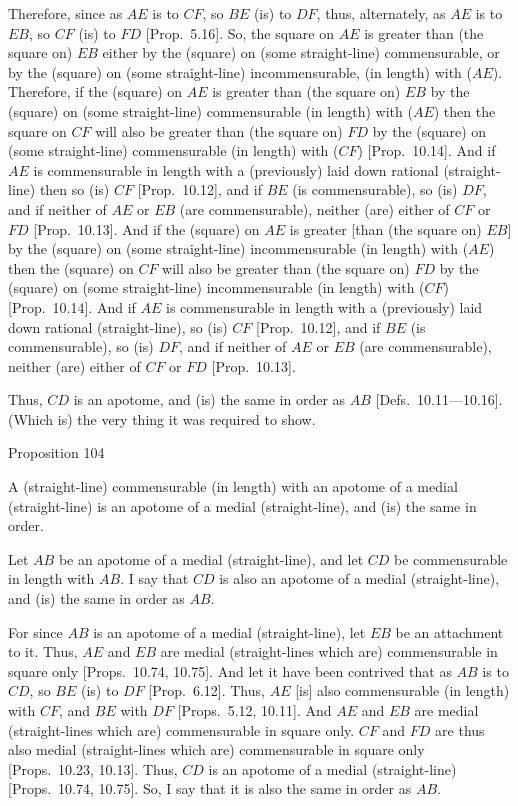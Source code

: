 Therefore, since as $AE$ is to $CF$, so $BE$ (is) to $DF$, thus, alternately,
as $AE$ is to $EB$, so $CF$ (is) to $FD$ [Prop.~5.16]. So,  the square on $AE$
is greater than (the square on) $EB$ either by the (square) on (some straight-line)
commensurable,  or by the (square) on (some straight-line)
incommensurable, (in length) with ($AE$). Therefore, if the
(square) on $AE$ is greater than (the square on) $EB$ by the (square)
on (some straight-line) commensurable (in length) with ($AE$) then the
square on $CF$ will also be greater than (the square on) $FD$ by the (square)
on (some straight-line) commensurable (in length) with ($CF$)
[Prop.~10.14]. And if $AE$ is commensurable
in length with a (previously) laid down rational (straight-line) then so (is)
$CF$ [Prop.~10.12], and if $BE$ (is commensurable), so (is) $DF$, and if neither of
$AE$ or $EB$ (are commensurable), neither  (are) either of $CF$ or $FD$
[Prop.~10.13]. And if the (square) on
$AE$ is greater [than (the square on) $EB$] by the (square) on
(some straight-line) incommensurable (in length) with ($AE$) then the
(square) on $CF$ will also be greater than (the square on) $FD$ by the (square)
on (some straight-line) incommensurable (in length) with ($CF$)
[Prop.~10.14].  And if $AE$ is commensurable
in length with a (previously) laid down rational (straight-line), so (is)
$CF$ [Prop.~10.12], and if $BE$ (is commensurable), so (is) $DF$, and if neither of
$AE$ or $EB$ (are commensurable),  neither (are)  either of $CF$ or $FD$
[Prop.~10.13].

Thus, $CD$ is an apotome, and (is) the same in order as $AB$ [Defs.~10.11---10.16].
(Which is) the very thing it was required to show.


\begin{center}
{\large Proposition 104}
\end{center}

A (straight-line) commensurable (in length)
with an apotome of a medial (straight-line) is an apotome of a
medial (straight-line), and (is) the same in order.

\epsfysize=0.7in
\centerline{}

Let $AB$ be an apotome of a medial (straight-line), and let $CD$
be commensurable in length with $AB$. I say that $CD$ is also an
apotome of a medial (straight-line), and (is) the same in order as $AB$.

For since $AB$ is an apotome of a medial (straight-line), let $EB$ be
an attachment to it. Thus, $AE$ and $EB$ are medial (straight-lines which are) commensurable in square only [Props.~10.74, 10.75]. And let it have been contrived that as
$AB$ is to $CD$, so $BE$ (is) to $DF$ [Prop.~6.12]. 
Thus, $AE$ [is] also commensurable (in length) with $CF$, and $BE$
with $DF$ [Props.~5.12, 10.11]. And $AE$ and $EB$ are medial (straight-lines which are) commensurable in square only. $CF$ and $FD$
are thus also medial (straight-lines which are) commensurable in square only
[Props.~10.23, 10.13]. 
Thus, $CD$ is an apotome of a medial (straight-line) [Props.~10.74, 10.75].
So, I say that it is also the same in order as $AB$.

